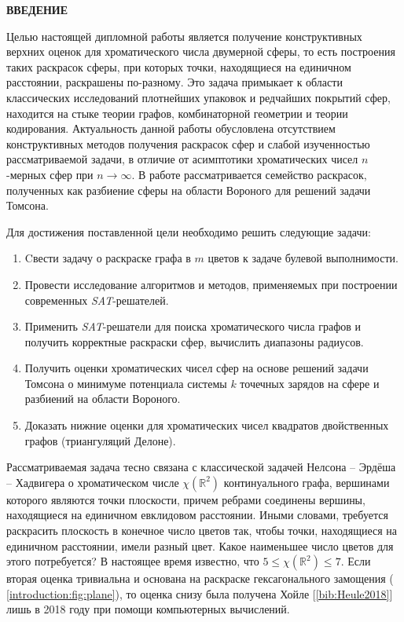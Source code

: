 \newpage
\begin{center}
\noindent\textbf{ВВЕДЕНИЕ}\label{chapters:introduction}
\vspace{1.5mm}
\end{center}

Целью настоящей дипломной работы является получение конструктивных верхних оценок для хроматического числа двумерной сферы, 
то есть построения таких раскрасок сферы, при которых точки, находящиеся на единичном расстоянии, раскрашены по-разному. 
Это задача примыкает к области классических исследований плотнейших упаковок и редчайших покрытий сфер, находится на стыке
теории графов, комбинаторной геометрии и теории кодирования.
Актуальность данной работы обусловлена отсутствием конструктивных методов получения раскрасок сфер и слабой изученностью рассматриваемой задачи, в отличие от асимптотики хроматических чисел $n$-мерных сфер при $n\to\infty$. 
В работе рассматривается семейство раскрасок, полученных как разбиение сферы на области Вороного для решений задачи Томсона.

Для достижения поставленной цели необходимо решить следующие задачи:

\begin{enumerate}[leftmargin=1cm,topsep=0pt,itemsep=-1ex,partopsep=1ex,parsep=1ex,label=\arabic{*}.]

\item Cвести задачу о раскраске графа в $m$ цветов к задаче булевой выполнимости.
\item Провести исследование алгоритмов и методов, применяемых при построении современных \textit{SAT}-решателей.
\item Применить \textit{SAT}-решатели для поиска хроматического числа графов и получить корректные раскраски сфер, вычислить диапазоны радиусов.
\item Получить оценки хроматических чисел сфер на основе решений задачи Томсона о минимуме потенциала системы $k$ точечных зарядов на сфере и разбиений на области Вороного.
\item Доказать нижние оценки для хроматических чисел квадратов двойственных графов (триангуляций Делоне).

\end{enumerate}

Рассматриваемая задача тесно связана с классической задачей Нелсона -- Эрдёша -- Хадвигера о хроматическом числе $\chi(\mathbb{R}^2)$ континуального графа, вершинами которого являются точки плоскости, причем ребрами соединены вершины, находящиеся на единичном евклидовом расстоянии. Иными словами, требуется раскрасить плоскость в конечное число цветов так, чтобы точки, находящиеся на единичном расстоянии, имели разный цвет. Какое наименьшее число цветов для этого потребуется? В настоящее время известно, что $5 \leq \chi(\mathbb{R}^2) \leq 7$. Если вторая оценка тривиальна и основана на раскраске гексагонального замощения (\figurename{ \ref{introduction:fig:plane}}), то оценка снизу была получена Хойле [\ref{bib:Heule2018}] лишь в 2018 году при помощи компьютерных вычислений. 

